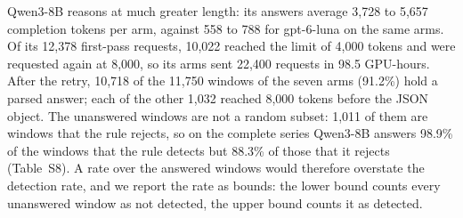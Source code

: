Qwen3-8B reasons at much greater length: its answers average 3{,}728 to 5{,}657 completion tokens per arm, against 558 to 788 for gpt-6-luna on the same arms. Of its 12{,}378 first-pass requests, 10{,}022 reached the limit of 4{,}000 tokens and were requested again at 8{,}000, so its arms sent 22{,}400 requests in 98.5 GPU-hours. After the retry, 10{,}718 of the 11{,}750 windows of the seven arms (91.2\%) hold a parsed answer; each of the other 1{,}032 reached 8{,}000 tokens before the JSON object. The unanswered windows are not a random subset: 1{,}011 of them are windows that the rule rejects, so on the complete series Qwen3-8B answers 98.9\% of the windows that the rule detects but 88.3\% of those that it rejects (Table~S8). A rate over the answered windows would therefore overstate the detection rate, and we report the rate as bounds: the lower bound counts every unanswered window as not detected, the upper bound counts it as detected.

